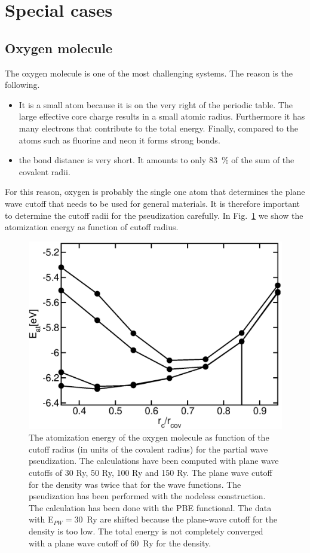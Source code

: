 \documentclass[11pt,a4paper]{report}
\begin{document}
\section{Special cases}
\subsection{Oxygen molecule}
The oxygen molecule is one of the most challenging systems. The reason
is the following.
\begin{itemize}
\item It is a small atom because it is on the very right of the
  periodic table. The large effective core charge results in a small
  atomic radius. Furthermore it has many electrons that contribute to
  the total energy. Finally, compared to the atoms such as fluorine
  and neon it forms strong bonds.
\item the bond distance is very short. It amounts to only 83~\% of the
  sum of the covalent radii.
\end{itemize}
For this reason, oxygen is probably the single one atom that
determines the plane wave cutoff that needs to be used for general
materials.  It is therefore important to determine the cutoff radii
for the pseudization carefully. In Fig.~\ref{o2_eatinev_ndlssofrad} we
show the atomization energy as function of cutoff radius. 

\begin{figure}[h!]
\begin{center}
\includegraphics[width=0.5\linewidth,clip=true]
{Figs/O2_atomizationenergy/eofrc.eps}
\end{center}
\caption{\label{o2_eatinev_ndlssofrad}The atomization energy of the
  oxygen molecule as function of the cutoff radius (in units of the
  covalent radius) for the partial wave pseudization. The calculations
  have been computed with plane wave cutoffs of 30 Ry, 50 Ry, 100 Ry
  and 150 Ry. The plane wave cutoff for the density was twice that for
  the wave functions. The pseudization has been performed with the
  nodeless construction. The calculation has been done with the PBE
  functional. The data with E$_{PW}=30$~Ry are shifted because the
  plane-wave cutoff for the density is too low.  The total energy is
  not completely converged with a plane wave cutoff of 60~Ry for the
  density.  }
\end{figure}
\end{document}
